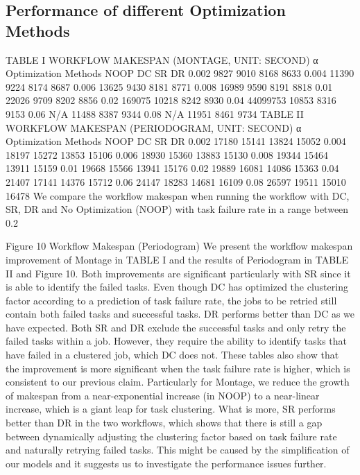 \documentclass{IOS-Book-Article}
\begin{document}
\subsection{Performance of different Optimization Methods}
TABLE I	WORKFLOW MAKESPAN (MONTAGE, UNIT: SECOND) 
α	Optimization Methods
	NOOP	DC	SR	DR
0.002	9827	9010	8168	8633
0.004	11390	9224	8174	8687
0.006	13625	9430	8181	8771
0.008	16989	9590	8191	8818
0.01	22026	9709	8202	8856
0.02	169075	10218	8242	8930
0.04	44099753	10853	8316	9153
0.06	N/A 	11488	8387	9344
0.08	N/A	11951	8461	9734
TABLE II	WORKFLOW MAKESPAN (PERIODOGRAM, UNIT: SECOND) 
α	Optimization Methods
	NOOP	DC	SR	DR
0.002	17180	15141	13824	15052
0.004	18197	15272	13853	15106
0.006	18930	15360	13883	15130
0.008	19344	15464	13911	15159
0.01	19668	15566	13941	15176
0.02	19889	16081	14086	15363
0.04	21407	17141	14376	15712
0.06	24147	18283	14681	16109
0.08	26597	19511	15010	16478
We compare the workflow makespan when running the workflow with DC, SR, DR and No Optimization (NOOP) with task failure rate in a range between 0.2%

 
Figure 10	Workflow Makespan (Periodogram)
We present the workflow makespan improvement of Montage in TABLE I and the results of Periodogram in TABLE II and Figure 10. Both improvements are significant particularly with SR since it is able to identify the failed tasks. Even though DC has optimized the clustering factor according to a prediction of task failure rate, the jobs to be retried still contain both failed tasks and successful tasks. DR performs better than DC as we have expected. Both SR and DR exclude the successful tasks and only retry the failed tasks within a job. However, they require the ability to identify tasks that have failed in a clustered job, which DC does not. These tables also show that the improvement is more significant when the task failure rate is higher, which is consistent to our previous claim. Particularly for Montage, we reduce the growth of makespan from a near-exponential increase (in NOOP) to a near-linear increase, which is a giant leap for task clustering. What is more, SR performs better than DR in the two workflows, which shows that there is still a gap between dynamically adjusting the clustering factor based on task failure rate and naturally retrying failed tasks. This might be caused by the simplification of our models and it suggests us to investigate the performance issues further.
\end{document}
